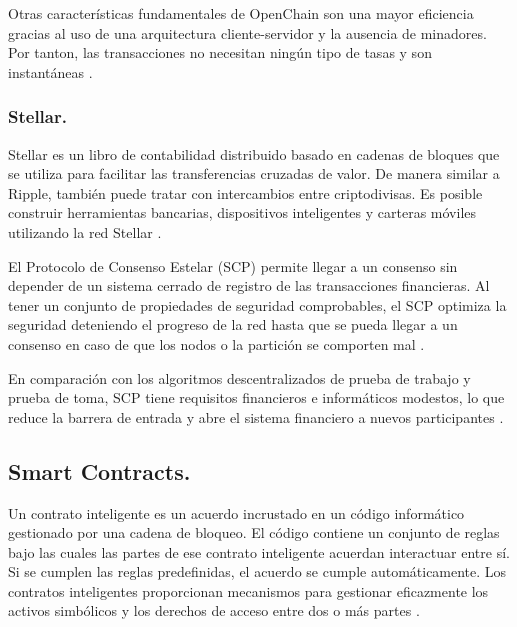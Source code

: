 \vspace{5mm}

\noindent Otras características fundamentales de OpenChain son una mayor eficiencia gracias al uso de una arquitectura 
cliente-servidor y la ausencia de minadores. Por tanton, las transacciones no necesitan ningún tipo de tasas y son 
instantáneas \cite{top-blockchain-platforms-app2}.

\subsubsection*{Stellar.}

Stellar es un libro de contabilidad distribuido basado en cadenas de bloques que se utiliza para facilitar las 
transferencias cruzadas de valor. De manera similar a Ripple, también puede tratar con intercambios entre 
criptodivisas. Es posible construir herramientas bancarias, dispositivos inteligentes y carteras móviles utilizando 
la red Stellar \cite{top-blockchain-platforms-app2}.

\vspace{5mm}

\noindent El Protocolo de Consenso Estelar (SCP) permite llegar a un consenso sin depender de un sistema cerrado de 
registro de las transacciones financieras. Al tener un conjunto de propiedades de seguridad comprobables, el SCP 
optimiza la seguridad deteniendo el progreso de la red hasta que se pueda llegar a un consenso en caso de que los nodos 
o la partición se comporten mal \cite{top-blockchain-platforms-app2}.

\vspace{5mm}

\noindent En comparación con los algoritmos descentralizados de prueba de trabajo y prueba de toma, SCP tiene 
requisitos financieros e informáticos modestos, lo que reduce la barrera de entrada y abre el sistema financiero a 
nuevos participantes \cite{top-blockchain-platforms, top-blockchain-platforms-app2}.

\subsection{Smart Contracts.}

Un contrato inteligente es un acuerdo incrustado en un código informático gestionado por una cadena de bloqueo. El 
código contiene un conjunto de reglas bajo las cuales las partes de ese contrato inteligente acuerdan interactuar entre 
sí. Si se cumplen las reglas predefinidas, el acuerdo se cumple automáticamente. Los contratos inteligentes 
proporcionan mecanismos para gestionar eficazmente los activos simbólicos y los derechos de acceso entre dos o más 
partes \cite{what-is-smart-contract}. 

